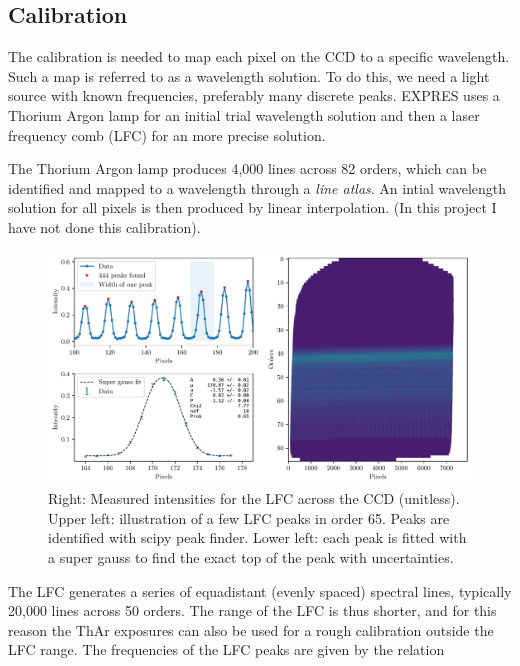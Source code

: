 \subsection{Calibration} 

    The calibration is needed to map each pixel on the CCD to a specific wavelength. Such a map is referred to as a wavelength solution. To do this, we need a light source with known frequencies, preferably many discrete peaks. EXPRES uses a Thorium Argon lamp for an initial trial wavelength solution and then a laser frequency comb (LFC) for an more precise solution.
    
    The Thorium Argon lamp produces 4,000 lines across 82 orders, which can be identified and mapped to a wavelength through a \emph{line atlas}. An intial wavelength solution for all pixels is then produced by linear interpolation. (In this project I have not done this calibration).

    \begin{figure}%
        \begin{wide}  
            \includegraphics[width=\textwidth]{figures/LFC_peak_fitting_overview.pdf}
            \caption{Right: Measured intensities for the LFC across the CCD (unitless). Upper left: illustration of a few LFC peaks in order 65. Peaks are identified with scipy peak finder. Lower left: each peak is fitted with a super gauss to find the exact top of the peak with uncertainties.}
            \label{fig:LFC_CCD}
        \end{wide}
    \end{figure}

    The LFC generates a series of equadistant (evenly spaced) spectral lines, typically 20,000 lines across 50 orders. The range of the LFC is thus shorter, and for this reason the ThAr exposures can also be used for a rough calibration outside the LFC range. The frequencies of the LFC peaks are given by the relation
    
